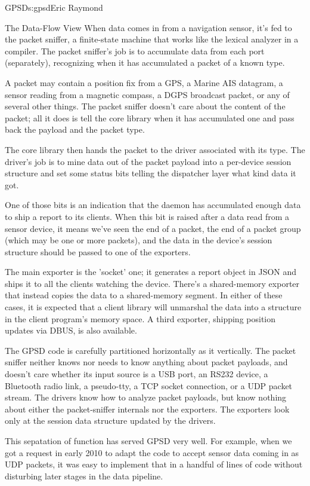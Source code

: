 \begin{aosachapter}{GPSD}{s:gpsd}{Eric Raymond}
\begin{aosasect1}{The Data-Flow View}
When data comes in from a navigation sensor, it's fed to the packet
sniffer, a finite-state machine that works like the lexical analyzer
in a compiler.  The packet sniffer's job is to accumulate data from
each port (separately), recognizing when it has accumulated a packet
of a known type.

A packet may contain a position fix from a GPS, a Marine AIS datagram,
a sensor reading from a magnetic compass, a DGPS broadcast packet, or any
of several other things.  The packet sniffer doesn't care about the 
content of the packet; all it does is tell the core library when it
has accumulated one and pass back the payload and the packet type.

The core library then hands the packet to the driver associated with
its type.  The driver's job is to mine data out of the packet payload
into a per-device session structure and set some status bits telling
the dispatcher layer what kind data it got.

One of those bits is an indication that the daemon has accumulated
enough data to ship a report to its clients.  When this bit is raised
after a data read from a sensor device, it means we've seen the end of a
packet, the end of a packet group (which may be one or more packets),
and the data in the device's session structure should be passed to one
of the exporters.

The main exporter is the 'socket' one; it generates a report object in JSON
and ships it to all the clients watching the device. There's a shared-memory 
exporter that instead copies the data to a shared-memory segment. In either 
of these cases, it is expected that a client library will unmarshal the
data into a structure in the client program's memory space.  A third 
exporter, shipping position updates via DBUS, is also available.

The GPSD code is carefully partitioned horizontally as it vertically.  The
packet sniffer neither knows nor needs to know anything about packet
payloads, and doesn't care whether its input source is a USB port,
an RS232 device, a Bluetooth radio link, a pseudo-tty, a TCP socket
connection, or a UDP packet stream.  The drivers know how to analyze
packet payloads, but know nothing about either the packet-sniffer
internals nor the exporters.  The exporters look only at the session
data structure updated by the drivers.

This sepatation of function has served GPSD very well. For example,
when we got a request in early 2010 to adapt the code to accept sensor
data coming in as UDP packets, it was easy to implement that in a
handful of lines of code without disturbing later stages in the data
pipeline.


\end{aosasect1}
\end{aosachapter}
